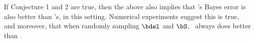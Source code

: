 \documentclass[10pt]{article}
\begin{document}
If Conjecture 1 and 2 are true, then the above also implies that \Lol's Bayes error is also better than \Pca's, in this setting.
Numerical experiments suggest this is true, and moreover, that when randomly sampling $\bdel$ and $\bS$, \Lol~always does better than \Pca.



\end{document}

